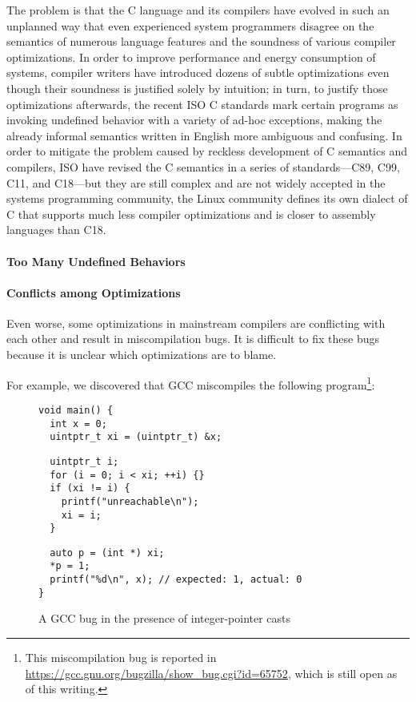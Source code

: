 The problem is that the C language and its compilers have evolved in such an unplanned way that even
experienced system programmers disagree on the semantics of numerous language features and the
soundness of various compiler optimizations.  In order to improve performance and energy consumption
of systems, compiler writers have introduced dozens of subtle optimizations even though their
soundness is justified solely by intuition; in turn, to justify those optimizations afterwards, the
recent ISO C standards mark certain programs as invoking undefined behavior with a variety of ad-hoc
exceptions, making the already informal semantics written in English more ambiguous and confusing.
In order to mitigate the problem caused by reckless development of C semantics and compilers, ISO
have revised the C semantics in a series of standards---C89, C99, C11, and C18---but they are still
complex and are not widely accepted in the systems programming community, \eg{} the Linux community
defines its own dialect of C that supports much less compiler optimizations and is closer to
assembly languages than C18.


\paragraph{Too Many Undefined Behaviors}



\paragraph{Conflicts among Optimizations}

Even worse, some optimizations in mainstream compilers are conflicting with each other and result in
miscompilation bugs.  It is difficult to fix these bugs because it is unclear which optimizations
are to blame.

For example, we discovered that GCC miscompiles the following program\footnote{This miscompilation
  bug is reported in \url{https://gcc.gnu.org/bugzilla/show_bug.cgi?id=65752}, which is still open
  as of this writing.}:
%
\begin{figure}
\begin{center}
\small
\begin{minipage}{0.5\textwidth}
\begin{verbatim}
void main() { 
  int x = 0;
  uintptr_t xi = (uintptr_t) &x;
\end{verbatim}
\vskip -0.7cm
\begin{verbatim}
  uintptr_t i;
  for (i = 0; i < xi; ++i) {}
  if (xi != i) {
    printf("unreachable\n");
    xi = i;
  }
\end{verbatim}
\vskip -0.7cm
\begin{verbatim}
  auto p = (int *) xi;
  *p = 1;
  printf("%d\n", x); // expected: 1, actual: 0
}
\end{verbatim}
\end{minipage}
\end{center}
\caption{A GCC bug in the presence of integer-pointer casts}
\label{fig:introduction:bug}
\end{figure}

